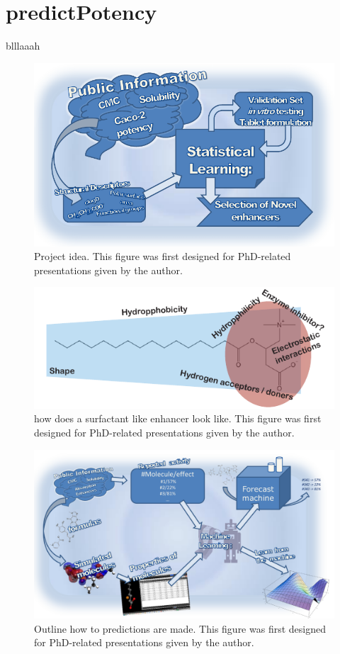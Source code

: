 \chapter{predictPotency}

blllaaah
\begin{figure}[ht]
\label{devel_fassif}
\includegraphics{graphics/workSummary_130mm.pdf}
\caption{Project idea. This figure was first designed for PhD-related presentations given by the author.}
\end{figure}


\begin{figure}[ht]
\label{devel_fassif}
\includegraphics{graphics/typeOfSurfactant.pdf}
\caption{how does a surfactant like enhancer look like. This figure was first designed for PhD-related presentations given by the author.}
\end{figure}

\begin{figure}[ht]
\label{devel_fassif}
\includegraphics[width=\textwidth, height=\textheight, keepaspectratio]{graphics/predictPotencySummary.pdf}
\caption{Outline how to predictions are made. This figure was first designed for PhD-related presentations given by the author.}
\end{figure}

